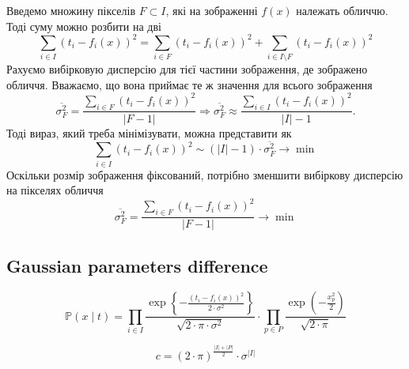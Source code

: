 Введемо множину пікселів $F \subset I$,
які на зображенні $f\left( x \right)$ належать обличчю.
Тоді суму можно розбити на дві
\begin{equation*}
  \sum_{i \in I} \left( t_i - f_i\left( x \right) \right)^2
  = \sum_{i \in F} \left( t_i - f_i\left( x \right) \right)^2
  + \sum_{i \in I \setminus F} \left( t_i - f_i\left( x \right) \right)^2
\end{equation*}
Рахуємо вибірковую дисперсію для тієї частини зображення,
де зображено обличчя.
Вважаємо, що вона приймає те ж значення для всього зображення
\begin{equation*}
  \overline{\sigma_F^2}
  = \frac{\sum\limits_{i \in F} \left( t_i - f_i\left( x \right) \right)^2}
         {\left| F - 1 \right|}
  \Rightarrow
  \overline{\sigma_F^2}
  \approx \frac{\sum\limits_{i \in I}
             \left( t_i - f_i\left( x \right) \right)^2}
            {\left| I \right| - 1}.
\end{equation*}
Тоді вираз, який треба мінімізувати, можна представити як
\begin{equation*}
  \sum_{i \in I} \left( t_i - f_i\left( x \right) \right)^2
  \sim \left( \left| I \right| - 1 \right) \cdot \overline{\sigma_F^2}
  \to \min
\end{equation*}
Оскільки розмір зображення фіксований,
потрібно зменшити вибіркову дисперсію на пікселях обличчя
\begin{equation*}
  \overline{\sigma_F^2}
  = \frac{\sum\limits_{i \in F} \left( t_i - f_i\left( x \right) \right)^2}
         {\left| F - 1 \right|}
  \to \min
\end{equation*}

\subsection{Gaussian parameters difference}

\begin{equation*}
  \mathbb{P}\left( x \mid t \right)
  = \prod_{i \in I}
    \frac{\exp{\left\{ - \frac{\left( t_i - f_i\left( x \right) \right)^2}
         {2 \cdot \sigma^2} \right\}}}{\sqrt{2 \cdot \pi \cdot \sigma^2}}
    \cdot
    \prod_{p \in P}
    \frac{\exp{\left( - \frac{x_p^2}{2} \right)}}{\sqrt{2 \cdot \pi}}
\end{equation*}

\begin{equation*}
  c = \left( 2 \cdot \pi \right)^{\frac{\left| I \right| + \left| P \right|}{2}}
      \cdot \sigma^{\left| I \right|}
\end{equation*}

